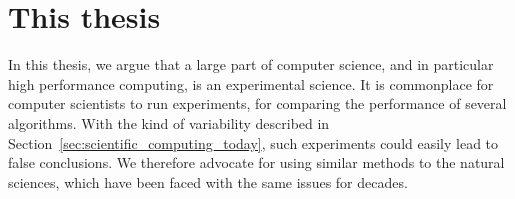     \section{This thesis}%
    \label{sec:this_thesis}

        In this thesis, we argue that a large part of computer science, and in particular high performance computing, is
        an experimental science. It is commonplace for computer scientists to run experiments, \eg for comparing the
        performance of several algorithms. With the kind of variability described in
        Section~\ref{sec:scientific_computing_today}, such experiments could easily lead to false conclusions. We
        therefore advocate for using similar methods to the natural sciences, which have been faced with the same issues
        for decades.

